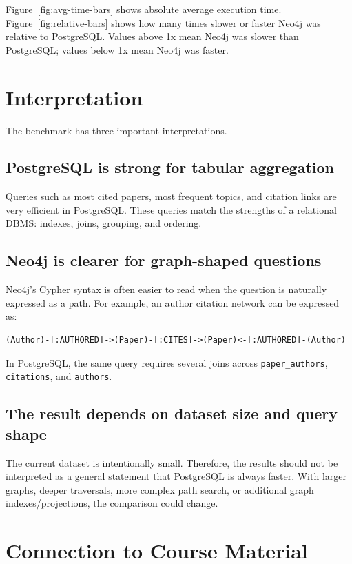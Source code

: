 \documentclass[11pt]{article}
\begin{document}
Figure~\ref{fig:avg-time-bars} shows absolute average execution time.
Figure~\ref{fig:relative-bars} shows how many times slower or faster Neo4j was relative to PostgreSQL.
Values above 1x mean Neo4j was slower than PostgreSQL; values below 1x mean Neo4j was faster.

\section{Interpretation}

The benchmark has three important interpretations.

\subsection{PostgreSQL is strong for tabular aggregation}

Queries such as most cited papers, most frequent topics, and citation links are very efficient in PostgreSQL.
These queries match the strengths of a relational DBMS: indexes, joins, grouping, and ordering.

\subsection{Neo4j is clearer for graph-shaped questions}

Neo4j's Cypher syntax is often easier to read when the question is naturally expressed as a path.
For example, an author citation network can be expressed as:

\begin{verbatim}
(Author)-[:AUTHORED]->(Paper)-[:CITES]->(Paper)<-[:AUTHORED]-(Author)
\end{verbatim}

In PostgreSQL, the same query requires several joins across \texttt{paper\_authors}, \texttt{citations}, and \texttt{authors}.

\subsection{The result depends on dataset size and query shape}

The current dataset is intentionally small.
Therefore, the results should not be interpreted as a general statement that PostgreSQL is always faster.
With larger graphs, deeper traversals, more complex path search, or additional graph indexes/projections, the comparison could change.

\section{Connection to Course Material}
\end{document}
